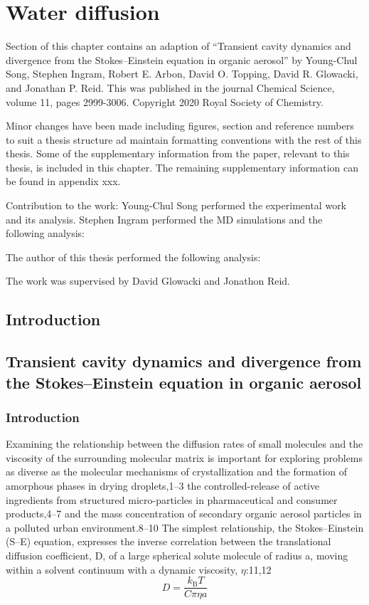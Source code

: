 %
%
\let\textcircled=\pgftextcircled
\chapter{Water diffusion}
\label{chap:water}


Section \label{sec:wat_paper} of this chapter contains an adaption of ``Transient cavity dynamics and divergence from the Stokes–Einstein equation in organic aerosol'' by Young-Chul Song, Stephen Ingram, Robert E. Arbon, David O. Topping, David R. Glowacki, and Jonathan P. Reid. This was published in the journal Chemical Science, volume 11, pages 2999-3006. Copyright 2020 Royal Society of Chemistry. 

Minor changes have been made including figures, section and reference numbers to suit a thesis structure ad maintain formatting conventions with the rest of this thesis. Some of the supplementary information from the paper, relevant to this thesis, is included in this chapter. The remaining supplementary information can be found in appendix  xxx. 

Contribution to the work: Young-Chul Song performed the experimental work and its analysis. Stephen Ingram performed the MD simulations and the following analysis: 

The author of this thesis performed the following analysis: 


The work was supervised by David Glowacki and Jonathon Reid. 

\section{Introduction}

\section{Transient cavity dynamics and divergence from the Stokes–Einstein equation in organic aerosol}\label{sec:wat_paper}
\subsection{Introduction}


Examining the relationship between the diffusion rates of small molecules and the viscosity of the surrounding molecular matrix is important for exploring problems as diverse as the molecular mechanisms of crystallization and the formation of amorphous phases in drying droplets,1–3 the controlled-release of active ingredients from structured micro-particles in pharmaceutical and consumer products,4–7 and the mass concentration of secondary organic aerosol particles in a polluted urban environment.8–10 The simplest relationship, the Stokes–Einstein (S–E) equation, expresses the inverse correlation between the translational diffusion coefficient, D, of a large spherical solute molecule of radius a, moving within a solvent continuum with a dynamic viscosity, $\eta$:11,12
\begin{equation}\label{eqn:diffusion}
D=\frac{k_{\mathrm{B}} T}{C \pi \eta a}
\end{equation}

